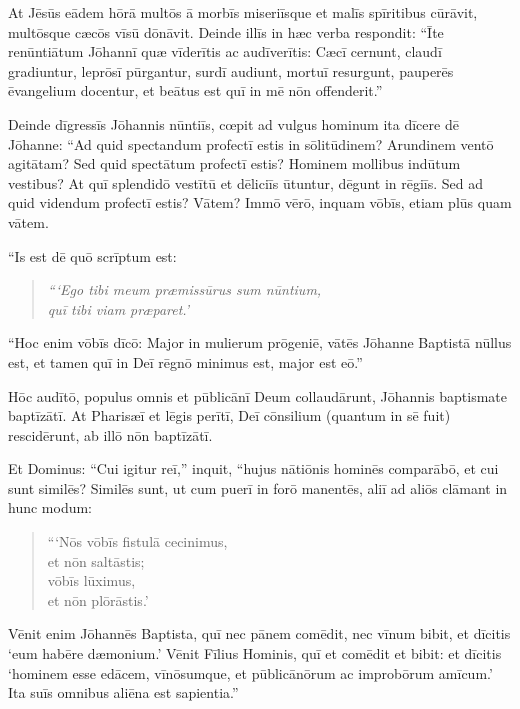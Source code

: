 \Versus At Jēsūs eādem hōrā multōs ā morbīs miseriīsque et malīs spīritibus cūrāvit, multōsque cæcōs vīsū dōnāvit.
\Versus Deinde illīs in hæc verba respondit: ``Īte renūntiātum Jōhannī quæ vīderītis ac audīverītis: Cæcī cernunt, claudī gradiuntur, leprōsī pūrgantur, surdī audiunt, mortuī resurgunt, pauperēs ēvangelium docentur,
\Versus et beātus est quī in mē nōn offenderit.''

\Versus Deinde dīgressīs Jōhannis nūntiīs, cœpit ad vulgus hominum ita dīcere dē Jōhanne: ``Ad quid spectandum profectī estis in sōlitūdinem? Arundinem ventō agitātam?
\Versus Sed quid spectātum profectī estis? Hominem mollibus indūtum vestibus? At quī splendidō vestītū et dēliciīs ūtuntur, dēgunt in rēgiīs.
\Versus Sed ad quid videndum profectī estis? Vātem? Immō vērō, inquam vōbīs, etiam plūs quam vātem.

\Versus ``Is est dē quō scrīptum est:
\begin{verse}
\begin{patverse*}
\emph{``{}`Ego tibi meum præmissūrus sum nūntium,\\
quī tibi viam præparet.'}
\end{patverse*}
\end{verse}

\Versus ``Hoc enim vōbīs dīcō: Major in mulierum prōgeniē, vātēs Jōhanne Baptistā nūllus est, et tamen quī in Deī rēgnō minimus est, major est eō.''

\Versus Hōc audītō, populus omnis et pūblicānī Deum collaudārunt, Jōhannis baptismate baptīzātī.
\Versus At Pharisæī et lēgis perītī, Deī cōnsilium (quantum in sē fuit) rescidērunt, ab illō nōn baptīzātī.

\Versus Et Dominus: ``Cui igitur reī,'' inquit, ``hujus nātiōnis hominēs comparābō, et cui sunt similēs?
\Versus Similēs sunt, ut cum puerī in forō manentēs, aliī ad aliōs clāmant in hunc modum: 
\begin{verse}
\begin{patverse*}
```Nōs vōbīs fistulā cecinimus,\\
et nōn saltāstis;\\
vōbīs lūximus,\\
et nōn plōrāstis.'
\end{patverse*}
\end{verse}
\Versus Vēnit enim Jōhannēs Baptista, quī nec pānem comēdit, nec vīnum bibit, et dīcitis `eum habēre dæmonium.'
\Versus Vēnit Fīlius Hominis, quī et comēdit et bibit: et dīcitis `hominem esse edācem, vīnōsumque, et pūblicānōrum ac improbōrum amīcum.'
\Versus Ita suīs omnibus aliēna est sapientia.''

